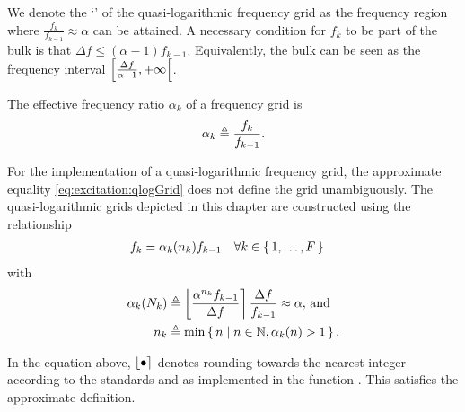   \begin{definition} \label{def:excitation:bulk}
  We denote the `' of the quasi-logarithmic frequency grid as the frequency region where $\frac{f_k}{f_{k-1}} \approx \alpha$ can be attained.
  A necessary condition for $f_k$ to be part of the bulk is that $\Delta f \leq \left(\alpha -1 \right) f_{k-1}$.
  Equivalently, the bulk can be seen as the frequency interval $\left[ \frac{\Delta f}{\alpha - 1} , +\infty \right[$.
  \end{definition}

  \begin{definition}
  The effective frequency ratio $\alpha_k$ of a frequency grid is
  \begin{equation}
    \alpha_k \triangleq  \frac{f_k}{f_{k-1}}
    \text{.}
  \end{equation}
  \end{definition}

  \begin{definition}
  For the implementation of a quasi-logarithmic frequency grid,  the approximate equality \eqref{eq:excitation:qlogGrid} does not define the grid unambiguously.
  The quasi-logarithmic grids depicted in this chapter are constructed using the relationship
  \begin{align}
       \label{eq:excitation:qlog:gridDef}
    f_k & = \alpha_k(n_k) f_{k-1}  
        \quad
            \forall k \in \set{1,\ldots,F}
\end{align}
with
\begin{align}
     \label{eq:excitation:qlog:roundAlpha}
      \alpha_k(N_k) & \triangleq 
          \left\lfloor    \frac{\alpha^{n_k} f_{k-1}}{\Delta f} \right\rceil    
           \frac{\Delta f}{f_{k-1}}
      \approx \alpha \text{, and}\\
         \label{eq:excitation:qlog:alphaPowerDef}
          n_k & \triangleq 
            \min 
            \set{n | n \in \ensuremath{\mathbb{N}}, \alpha_k(n) > 1}
     \text{.}
  \end{align}
  \end{definition}
  In the equation above, $\left\lfloor \bullet \right\rceil$ denotes rounding towards the nearest integer according to the \IEEEfloat standards and as implemented in the \MATLAB function .
  This satisfies the approximate definition.
  
